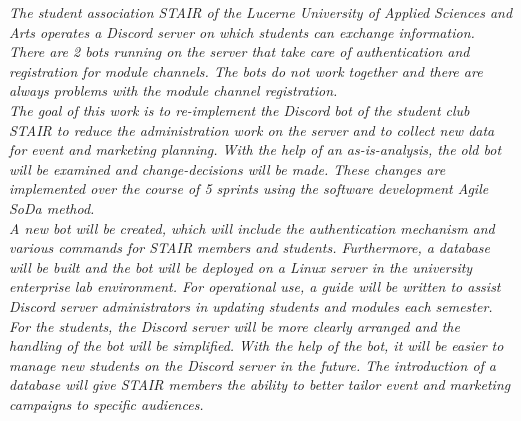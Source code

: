 \documentclass[a4paper, table]{article}
\begin{document}
\textit{
    The student association STAIR of the Lucerne University of Applied Sciences and Arts operates a Discord server on which students can exchange information. 
    There are 2 bots running on the server that take care of authentication and registration for module channels. 
    The bots do not work together and there are always problems with the module channel registration.\\
    The goal of this work is to re-implement the Discord bot of the student club STAIR to reduce the administration work on the server and to collect new data for event and marketing planning.
    With the help of an as-is-analysis, the old bot will be examined and change-decisions will be made.
    These changes are implemented over the course of 5 sprints using the software development Agile \gls{SoDa} method.\\
    A new bot will be created, which will include the authentication mechanism and various commands for STAIR members and students. 
    Furthermore, a database will be built and the bot will be deployed on a Linux server in the university enterprise lab environment. 
    For operational use, a guide will be written to assist Discord server administrators in updating students and modules each semester. \\
    For the students, the Discord server will be more clearly arranged and the handling of the bot will be simplified. 
    With the help of the bot, it will be easier to manage new students on the Discord server in the future. 
    The introduction of a database will give STAIR members the ability to better tailor event and marketing campaigns to specific audiences.}

\newpage
\printnoidxglossaries


\newpage
\tableofcontents

\newpage
\end{document}

